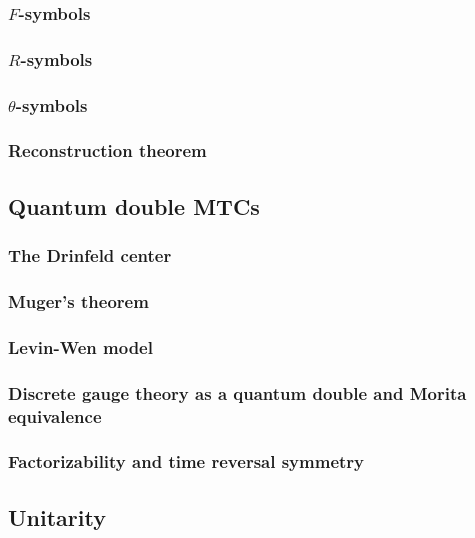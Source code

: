 \subsubsection{$F$-symbols}

\subsubsection{$R$-symbols}

\subsubsection{$\theta$-symbols}

\subsubsection{Reconstruction theorem}



\subsection{Quantum double MTCs}

\subsubsection{The Drinfeld center}

\subsubsection{Muger's theorem}

\subsubsection{Levin-Wen model}

\subsubsection{Discrete gauge theory as a quantum double and Morita equivalence}

\subsubsection{Factorizability and time reversal symmetry}



\subsection{Unitarity}

